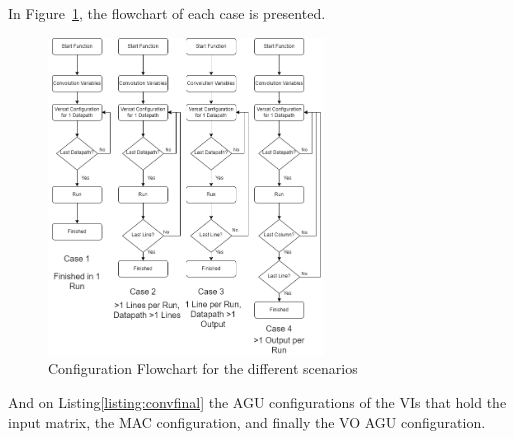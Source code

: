 In Figure~\ref{ConvFlowChart}, the flowchart of each case is presented.

\newpage
\begin{figure}[!htbp]
    \centering
    \includegraphics[width=0.65\textwidth]{Figures/ConvolutionFlowChart.drawio.png}
    \caption{Configuration Flowchart for the different scenarios}
    \label{ConvFlowChart}
\end{figure} 

And on Listing\ref{listing:convfinal} the AGU configurations of the VIs that hold the input matrix, the MAC configuration, and finally
the VO AGU configuration.




